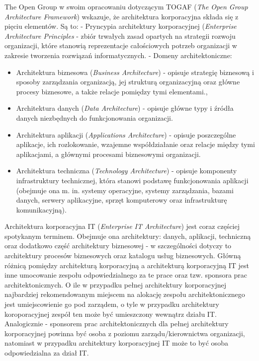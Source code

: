 The Open Group w swoim opracowaniu dotyczącym TOGAF (\textit{The Open Group Architecture Framework}) wskazuje, że architektura korporacyjna składa się z pięciu elementów. Są to:
- Pryncypia architektury korporacyjnej (\textit{Enterprise Architecture Principles} - zbiór trwałych zasad opartych na strategii rozwoju organizacji, które stanowią reprezentacje całościowych potrzeb organizacji w zakresie tworzenia rozwiązań informatycznych.
- Domeny architektoniczne:
\begin{itemize}
\item{Architektura biznesowa (\textit{Business Architecture}) - opisuje strategię biznesową i sposoby zarządzania organizacją, jej strukturą organizacyjną oraz główne procesy biznesowe, a także relacje pomiędzy tymi elementami.},
\item{Architektura danych (\textit{Data Architecture}) - opisuje główne typy i źródła danych niezbędnych do funkcjonowania organizacji.}
\item{Architektura aplikacji (\textit{Applications Architecture}) - opisuje poszczególne aplikacje, ich rozlokowanie, wzajemne współdziałanie oraz relacje między tymi aplikacjami, a głównymi procesami biznesowymi organizacji.}
\item{Architektura techniczna (\textit{Technology Architecture}) - opisuje komponenty infrastruktury technicznej, która stanowi podstawę funkcjonowania aplikacji (obejmuje ona m. in. systemy operacyjne, systemy zarządzania, bazami danych, serwery aplikacyjne, sprzęt komputerowy oraz infrastrukturę komunikacyjną).}
\end{itemize}


Architektura korporacyjna IT (\textit{Enterprise IT Architecture}) jest coraz częściej spotykanym terminem. Obejmuje ona architektury: danych, aplikacji, techniczną oraz dodatkowo część architektury biznesowej - w szczególności dotyczy to architektury procesów biznesowych oraz katalogu usług biznesowych. Główną różnicą pomiędzy architekturą korporacyjną a architekturą korporacyjną IT jest inne umocowanie zespołu odpowiedzialnego za te prace oraz tzw. sponsora prac architektonicznych. O ile w przypadku pełnej architektury korporacyjnej najbardziej rekomendowanym miejscem na alokację zespołu architektonicznego jest umiejscowienie go pod zarządem, o tyle w przypadku architektury koroporacyjnej zespół ten może być umieszczony wewnątrz działu IT. Analogicznie - sponsorem prac architektonicznych dla pełnej architektury korporacyjnej powinna być osoba z poziomu zarządu/kierownictwa organizacji, natomiast w przypadku architektury korporacyjnej IT może to być osoba odpowiedzialna za dział IT. 


